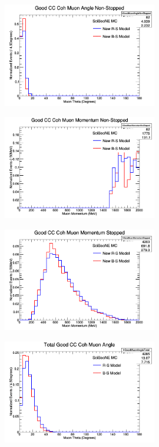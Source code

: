\documentclass[11pt]{article}
\begin{document}
\begin{figure}[H]
\centering
\includegraphics[width=0.6\textwidth]{ANMCombinedPlotsImages/8-ANMCombinedPlots.png}
\caption{}
\end{figure}

\begin{figure}[H]
\centering
\includegraphics[width=0.6\textwidth]{ANMCombinedPlotsImages/9-ANMCombinedPlots.png}
\caption{}
\end{figure}

\begin{figure}[H]
\centering
\includegraphics[width=0.6\textwidth]{ANMCombinedPlotsImages/10-ANMCombinedPlots.png}
\caption{}
\end{figure}

\begin{figure}[H]
\centering
\includegraphics[width=0.6\textwidth]{ANMCombinedPlotsImages/11-ANMCombinedPlots.png}
\caption{}
\end{figure}
\end{document}
